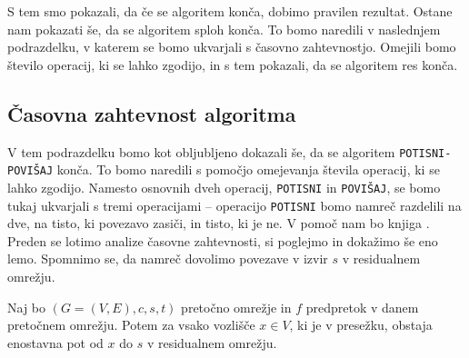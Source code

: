 \documentclass[mat1]{fmfdelo}
\begin{document}
S tem smo pokazali, da če se algoritem konča, dobimo pravilen rezultat. Ostane nam pokazati še, da se algoritem sploh konča. To bomo naredili v naslednjem podrazdelku, v katerem se bomo ukvarjali s časovno zahtevnostjo. Omejili bomo število operacij, ki se lahko zgodijo, in s tem pokazali, da se algoritem res konča.\\

\subsection{Časovna zahtevnost algoritma}

V tem podrazdelku bomo kot obljubljeno dokazali še, da se algoritem \texttt{POTISNI-POVIŠAJ} konča. To bomo naredili s pomočjo omejevanja števila operacij, ki se lahko zgodijo. Namesto osnovnih dveh operacij, \texttt{POTISNI} in \texttt{POVIŠAJ}, se bomo tukaj ukvarjali s tremi operacijami -- operacijo \texttt{POTISNI} bomo namreč razdelili na dve, na tisto, ki povezavo zasiči, in tisto, ki je ne. V pomoč nam bo knjiga \cite{clrs}.\\

Preden se lotimo analize časovne zahtevnosti, si poglejmo in dokažimo še eno lemo. Spomnimo se, da namreč dovolimo povezave v izvir $s$ v residualnem omrežju.\\

\begin{lema}\label{lem:enostavna_pot_s}
Naj bo $(G=(V,E),c,s,t)$ pretočno omrežje in $f$ predpretok v danem pretočnem omrežju. Potem za vsako vozlišče $x\in V$, ki je v presežku, obstaja enostavna pot od $x$ do $s$ v residualnem omrežju.
\end{lema}
\end{document}
